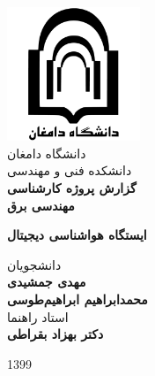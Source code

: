 \begin{titlepage}
	\begin{center}
		\includegraphics[width=0.3\textwidth]{Assets/logo.pdf}\\
		\smallskip \LARGE
		{دانشگاه دامغان}\\
		{دانشکده فنی و ‌مهندسی}\\
	
		\vspace{1cm} \LARGE
		\textbf{گزارش پروژه کارشناسی\\مهندسی برق}\\
		
		\vspace{1cm}
		
		\huge
		\textbf{ایستگاه هواشناسی دیجیتال}
		
		\LARGE
		\vspace{3cm}
		{دانشجویان}\\
		\vspace{0.25cm}
		\textbf{مهدی ‌جمشیدی\\محمد‌ابراهیم ابراهیم‌طوسی}\\
	
		\vspace{1.2cm}
		{استاد راهنما}\\
		\vspace{0.25cm}
		\textbf{دکتر بهزاد بقراطی}
		
		\vfill
		{1399}
	\end{center}
\end{titlepage}